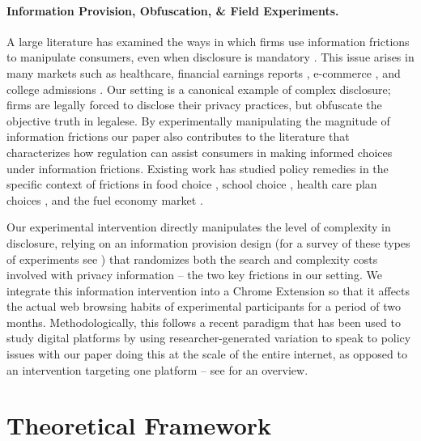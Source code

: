 \documentclass[12pt]{article}
\theoremstyle{definition}
\theoremstyle{remark}
\begin{document}
\paragraph{Information Provision, Obfuscation, \& Field Experiments.} A large literature has examined the ways in which firms use information frictions to manipulate consumers, even when disclosure is mandatory \citep{10.1257/jel.48.4.935, doi:10.1287/mnsc.2021.4037}. This issue arises in many markets such as healthcare, financial earnings reports \citep{dehaan2020disclosure}, e-commerce \citep{10.1162/qjec.2010.125.2.859, doi:10.1287/mksc.2020.1261}, and college admissions \citep{LUCA201517}. Our setting is a canonical example of complex disclosure; firms are legally forced to disclose their privacy practices, but obfuscate the objective truth in legalese. By experimentally manipulating the magnitude of information frictions our paper also contributes to the literature that characterizes how regulation can assist consumers in making informed choices under information frictions. Existing work has studied policy remedies in the specific context of frictions in food choice \citep{barahona2023equilibrium}, school choice  \citep{agte2024search}, health care plan choices \citep{handel2015health, brown2024endogenous}, and the fuel economy market \citep{allcott2019consumers}. 

Our experimental intervention directly manipulates the level of complexity in disclosure, relying on an information provision design (for a survey of these types of experiments see \cite{10.1257/jel.20211658}) that randomizes both the search and complexity costs involved with privacy information -- the two key frictions in our setting. We integrate this information intervention into a Chrome Extension so that it affects the actual web browsing habits of experimental participants for a period of two months. Methodologically, this follows a recent paradigm that has been used to study digital platforms by using researcher-generated variation to speak to policy issues with our paper doing this at the scale of the entire internet, as opposed to an intervention targeting one platform \citep{levy2021social, aridor2025measuring, beknazar2022toxic, allcott2025sources, fradkin2024data} -- see \cite{aridor2024Experiments} for an overview.



\section{Theoretical Framework}\label{sec:model_hypotheses}
\end{document}
